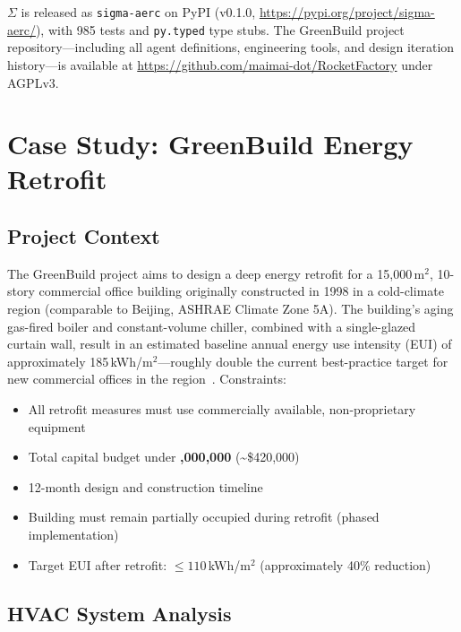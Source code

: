 \documentclass[11pt,a4paper]{article}
\begin{document}
$\Sigma$ is released as \texttt{sigma-aerc} on PyPI (v0.1.0, \url{https://pypi.org/project/sigma-aerc/}), with 985 tests and \texttt{py.typed} type stubs. The GreenBuild project repository---including all agent definitions, engineering tools, and design iteration history---is available at \url{https://github.com/maimai-dot/RocketFactory} under AGPLv3.

\section{Case Study: GreenBuild Energy Retrofit}

\subsection{Project Context}

The GreenBuild project aims to design a deep energy retrofit for a 15{,}000\,m$^2$, 10-story commercial office building originally constructed in 1998 in a cold-climate region (comparable to Beijing, ASHRAE Climate Zone 5A). The building's aging gas-fired boiler and constant-volume chiller, combined with a single-glazed curtain wall, result in an estimated baseline annual energy use intensity (EUI) of approximately 185\,kWh/m$^2$---roughly double the current best-practice target for new commercial offices in the region~\cite{ashrae901}. Constraints:

\begin{itemize}
    \item All retrofit measures must use commercially available, non-proprietary equipment
    \item Total capital budget under \textbf{,000,000} (\textasciitilde\$420{,}000)
    \item 12-month design and construction timeline
    \item Building must remain partially occupied during retrofit (phased implementation)
    \item Target EUI after retrofit: $\leq 110$\,kWh/m$^2$ (approximately 40\% reduction)
\end{itemize}

\subsection{HVAC System Analysis}
\end{document}
